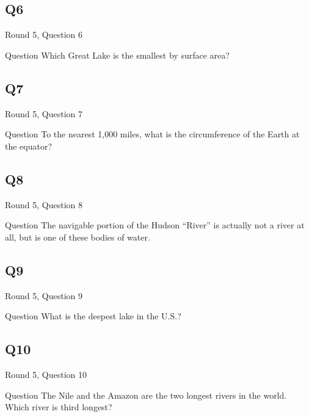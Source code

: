 \documentclass[11pt]{beamer}
\begin{document}
\subsection*{Q6}
\begin{frame}[t]{Round 5, Question 6}
\begin{block}{Question}
Which Great Lake is the smallest by surface area?
\end{block}
\end{frame}
\subsection*{Q7}
\begin{frame}[t]{Round 5, Question 7}
\begin{block}{Question}
To the nearest 1,000 miles, what is the circumference of the Earth at the equator?
\end{block}
\end{frame}
\subsection*{Q8}
\begin{frame}[t]{Round 5, Question 8}
\begin{block}{Question}
The navigable portion of the Hudson ``River'' is actually not a river at all, but is one of these bodies of water.
\end{block}
\end{frame}
\subsection*{Q9}
\begin{frame}[t]{Round 5, Question 9}
\begin{block}{Question}
What is the deepest lake in the U.S.?
\end{block}
\end{frame}
\subsection*{Q10}
\begin{frame}[t]{Round 5, Question 10}
\begin{block}{Question}
The Nile and the Amazon are the two longest rivers in the world. Which river is third longest?
\end{block}
\end{frame}
\end{document}
